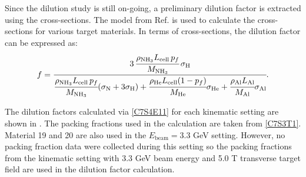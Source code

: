 Since the dilution study is still on-going, a preliminary dilution factor is extracted using the cross-sections. The model from Ref. \cite{Bosted2008} is used to calculate the cross-sections for various target materials. In terms of cross-sections, the dilution factor can be expressed as:
\begin{equation} \label{C7S4E11}
f = \cfrac{3\,\cfrac{\rho_{\mathrm{NH_3}}L_{\mathrm{cell}}\,p_f}{M_{\mathrm{NH_3}}}\,\sigma_{\mathrm{H}}}{\cfrac{\rho_{\mathrm{NH_3}}L_{\mathrm{cell}}\,p_f}{M_{\mathrm{NH_3}}}(\sigma_{\mathrm{N}}+3\sigma_{\mathrm{H}})+\cfrac{\rho_{\mathrm{He}}L_{\mathrm{cell}}(1-p_f)}{M_{\mathrm{He}}}\sigma_{\mathrm{He}}+\cfrac{\rho_{\mathrm{Al}}L_{\mathrm{Al}}}{M_{\mathrm{Al}}}\sigma_{\mathrm{Al}}}.
\end{equation}

The dilution factors calculated via \cref{C7S4E11} for each kinematic setting are shown in . The packing fractions used in the calculation are taken from \cref{C7S3T1}. Material 19 and 20 are also used in the $E_{\mathrm{beam}}=3.3$ GeV setting. However, no packing fraction data were collected during this setting so the packing fractions from the kinematic setting with 3.3 GeV beam energy and 5.0 T transverse target field are used in the dilution factor calculation.

